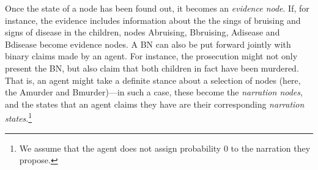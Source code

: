 \documentclass[
  10pt,
]{scrartcl}
\newcommand{\s}[1]{\textsf{#1}}
\begin{document}
Once the state of a node has been found out, it becomes an \emph{evidence node}. If, for instance, the evidence includes information about the the sings of bruising and signs of disease in the children, nodes \s{Abruising, Bbruising, Adisease} and \s{Bdisease} become evidence nodes. A BN can also be put forward jointly with binary claims made by an agent. For instance, the prosecution might not only present the BN, but also claim that both children in fact have been murdered. That is, an agent might take a definite stance about a selection of nodes (here, the \s{Amurder} and \s{Bmurder})---in such a case, these become the \emph{narration nodes}, and the states that an agent claims they have are their corresponding \emph{narration states}.\footnote{We assume that the agent does not assign probability 0 to the narration they propose.}
\end{document}
